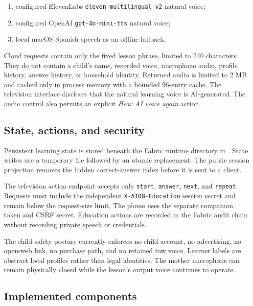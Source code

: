 \documentclass[11pt,a4paper]{article}
\begin{document}
\begin{enumerate}[leftmargin=*]
  \item configured ElevenLabs \texttt{eleven\_multilingual\_v2} natural voice;
  \item configured OpenAI \texttt{gpt-4o-mini-tts} natural voice;
  \item local macOS Spanish speech as an offline fallback.
\end{enumerate}

Cloud requests contain only the fixed lesson phrase, limited to 240
characters.  They do not contain a child's name, recorded voice, microphone
audio, profile history, answer history, or household identity.  Returned audio
is limited to 2 MB and cached only in process memory with a bounded 96-entry
cache.  The television interface discloses that the natural learning voice is
AI-generated.  The audio control also permits an explicit \emph{Hear AI voice
again} action.

\subsection{State, actions, and security}

Persistent learning state is stored beneath the Fabric runtime directory in
.  State writes use a temporary file
followed by an atomic replacement.  The public session projection removes the
hidden correct-answer index before it is sent to a client.

The television action endpoint accepts only \texttt{start}, \texttt{answer},
\texttt{next}, and \texttt{repeat}.  Requests must include the independent
\texttt{X-AION-Education} session secret and remain below the request-size
limit.  The phone uses the separate companion token and CSRF secret.  Education
actions are recorded in the Fabric audit chain without recording private
speech or credentials.

The child-safety posture currently enforces no child account, no advertising,
no open-web link, no purchase path, and no retained raw voice.  Learner labels
are abstract local profiles rather than legal identities.  The mother
microphone can remain physically closed while the lesson's output voice
continues to operate.

\subsection{Implemented components}
\end{document}
